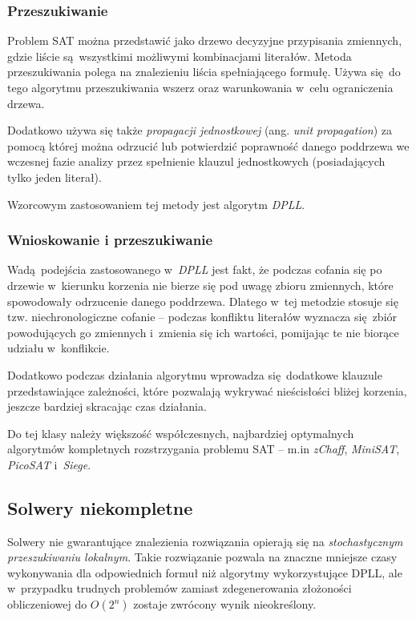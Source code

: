 \subsubsection{Przeszukiwanie}
Problem SAT można przedstawić jako drzewo decyzyjne przypisania zmiennych, gdzie liście są wszystkimi możliwymi kombinacjami literałów.
Metoda przeszukiwania polega na znalezieniu liścia spełniającego formułę. Używa się do tego algorytmu przeszukiwania wszerz oraz warunkowania
w~celu ograniczenia drzewa. 

Dodatkowo używa się także \textit{propagacji jednostkowej} (ang. \textit{unit propagation}) za pomocą której
można odrzucić lub potwierdzić poprawność danego poddrzewa we wczesnej fazie analizy przez spełnienie klauzul jednostkowych (posiadających tylko jeden literał).

Wzorcowym zastosowaniem tej metody jest algorytm \textit{DPLL}.

\subsubsection{Wnioskowanie i przeszukiwanie}
Wadą podejścia zastosowanego w~\textit{DPLL} jest fakt, że podczas cofania się po drzewie w~kierunku korzenia nie bierze się pod uwagę
zbioru zmiennych, które spowodowały odrzucenie danego poddrzewa.
Dlatego w~tej metodzie stosuje się tzw. niechronologiczne cofanie -- podczas konfliktu literałów wyznacza się zbiór powodujących 
go zmiennych i~zmienia się ich wartości, pomijając te nie biorące udziału w~konflikcie.

Dodatkowo podczas działania algorytmu wprowadza się dodatkowe klauzule przedstawiające zależności, które pozwalają wykrywać nieścisłości 
bliżej korzenia, jeszcze bardziej skracając czas działania.

Do tej klasy należy większość współczesnych, najbardziej optymalnych algorytmów kompletnych rozstrzygania problemu SAT -- m.in 
\textit{zChaff}, \textit{MiniSAT}, \textit{PicoSAT} i~\textit{Siege}.

\subsection{Solwery niekompletne}
Solwery nie gwarantujące znalezienia rozwiązania opierają się na \textit{stochastycznym przeszukiwaniu lokalnym}.
Takie rozwiązanie pozwala na znaczne mniejsze czasy wykonywania dla odpowiednich formuł niż algorytmy wykorzystujące DPLL, ale
w~przypadku trudnych problemów zamiast zdegenerowania złożoności obliczeniowej do $O(2^n)$ zostaje zwrócony wynik nieokreślony.  


